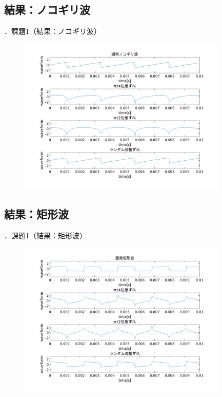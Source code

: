 \documentclass[aspectratio=43]{beamer}
\newcommand{\showsec}{\thesection ．}
\begin{document}
\subsection{結果：ノコギリ波}
\begin{frame}{\showsec 課題1（結果：ノコギリ波）}
    \begin{figure}
        \centering
        \includegraphics[keepaspectratio,width=0.89\textwidth]{no1_1_ans.png}
    \end{figure}
\end{frame}
\subsection{結果：矩形波}
\begin{frame}{\showsec 課題1（結果：矩形波）}
    \begin{figure}
        \centering
        \includegraphics[keepaspectratio,width=0.89\textwidth]{no1_2_ans.png}
    \end{figure}
\end{frame}
\end{document}
